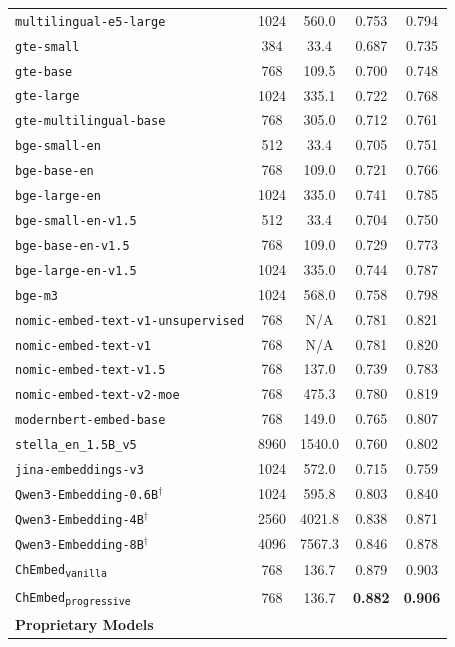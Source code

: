 \begin{table}[!t]
\begin{tabular}{lcccc}
    \texttt{multilingual-e5-large} & 1024 & 560.0 & 0.753 & 0.794 \\
    \texttt{gte-small} & 384 & 33.4 & 0.687 & 0.735 \\
    \texttt{gte-base} & 768 & 109.5 & 0.700 & 0.748 \\
    \texttt{gte-large} & 1024 & 335.1 & 0.722 & 0.768 \\
    \texttt{gte-multilingual-base} & 768 & 305.0 & 0.712 & 0.761 \\
    \texttt{bge-small-en} & 512 & 33.4 & 0.705 & 0.751 \\
    \texttt{bge-base-en} & 768 & 109.0 & 0.721 & 0.766 \\
    \texttt{bge-large-en} & 1024 & 335.0 & 0.741 & 0.785 \\
    \texttt{bge-small-en-v1.5} & 512 & 33.4 & 0.704 & 0.750 \\
    \texttt{bge-base-en-v1.5} & 768 & 109.0 & 0.729 & 0.773 \\
    \texttt{bge-large-en-v1.5} & 1024 & 335.0 & 0.744 & 0.787 \\
    \texttt{bge-m3} & 1024 & 568.0 & 0.758 & 0.798 \\
    \texttt{nomic-embed-text-v1-unsupervised} & 768 & N/A & 0.781 & 0.821 \\
    \texttt{nomic-embed-text-v1} & 768 & N/A & 0.781 & 0.820 \\
    \texttt{nomic-embed-text-v1.5} & 768 & 137.0 & 0.739 & 0.783 \\
    \texttt{nomic-embed-text-v2-moe} & 768 & 475.3 & 0.780 & 0.819 \\
    \texttt{modernbert-embed-base} & 768 & 149.0 & 0.765 & 0.807 \\
    \texttt{stella\_en\_1.5B\_v5} & 8960 & 1540.0 & 0.760 & 0.802 \\
    \texttt{jina-embeddings-v3} & 1024 & 572.0 & 0.715 & 0.759 \\
    \texttt{Qwen3-Embedding-0.6B}$^{\dagger}$ & 1024 & 595.8 & 0.803 & 0.840 \\
    \texttt{Qwen3-Embedding-4B}$^{\dagger}$ & 2560 & 4021.8 & 0.838 & 0.871 \\
    \texttt{Qwen3-Embedding-8B}$^{\dagger}$ & 4096 & 7567.3 & 0.846 & 0.878 \\
    \texttt{ChEmbed\textsubscript{vanilla}} & 768 & 136.7 & 0.879 & 0.903 \\
    \texttt{ChEmbed\textsubscript{progressive}} & 768 & 136.7 & \textbf{0.882} & \textbf{0.906} \\
    \midrule
    \multicolumn{5}{l}{\textbf{Proprietary Models}}\\

\end{tabular}
\end{table}

